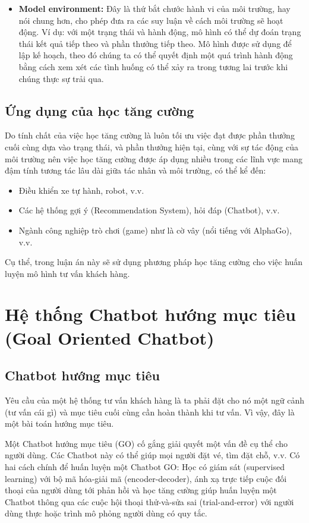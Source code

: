 \begin{itemize}
    \item \textbf{Model environment:} Đây là thứ bắt chước hành vi của môi trường, hay nói chung hơn, cho phép đưa ra các suy luận về cách môi trường sẽ hoạt động. Ví dụ: với một trạng thái và hành động, mô hình có thể dự đoán trạng thái kết quả tiếp theo và phần thưởng tiếp theo. Mô hình được sử dụng để lập kế hoạch, theo đó chúng ta có thể quyết định một quá trình hành động bằng cách xem xét các tình huống có thể xảy ra trong tương lai trước khi chúng thực sự trải qua.
\end{itemize}

\subsection{Ứng dụng của học tăng cường}
Do tính chất của việc học tăng cường là luôn tối ưu việc đạt được phần thưởng cuối cùng dựa vào trạng thái, và phần thưởng hiện tại, cùng với sự tác động của môi trường nên việc học tăng cường được áp dụng nhiều trong các lĩnh vực mang đậm tính tương tác lâu dài giữa tác nhân và môi trường, có thể kể đến:

\begin{itemize}
    \item Điều khiển xe tự hành, robot, v.v.
    \item Các hệ thống gợi ý (Recommendation System), hỏi đáp (Chatbot), v.v.
    \item Ngành công nghiệp trò chơi (game) như là cờ vây (nổi tiếng với AlphaGo), v.v.
\end{itemize}

Cụ thể, trong luận án này sẽ sử dụng phương pháp học tăng cường cho việc huấn luyện mô hình tư vấn khách hàng.

\section{Hệ thống Chatbot hướng mục tiêu (Goal Oriented Chatbot)}
\subsection{Chatbot hướng mục tiêu}
\label{subsec:chatbotgo}
Yêu cầu của một hệ thống tư vấn khách hàng là ta phải đặt cho nó một ngữ cảnh (tư vấn cái gì) và mục tiêu cuối cùng cần hoàn thành khi tư vấn. Vì vậy, đây là một bài toán hướng mục tiêu.

Một Chatbot hướng mục tiêu (GO) cố gắng giải quyết một vấn đề cụ thể cho người dùng. Các Chatbot này có thể giúp mọi người đặt vé, tìm đặt chỗ, v.v. Có hai cách chính để huấn luyện một Chatbot GO: Học có giám sát (supervised learning) với bộ mã hóa-giải mã (encoder-decoder), ánh xạ trực tiếp cuộc đối thoại của người dùng tới phản hồi và học tăng cường giúp huấn luyện một Chatbot thông qua các cuộc hội thoại thử-và-sửa sai (trial-and-error) với người dùng thực hoặc trình mô phỏng người dùng có quy tắc.

